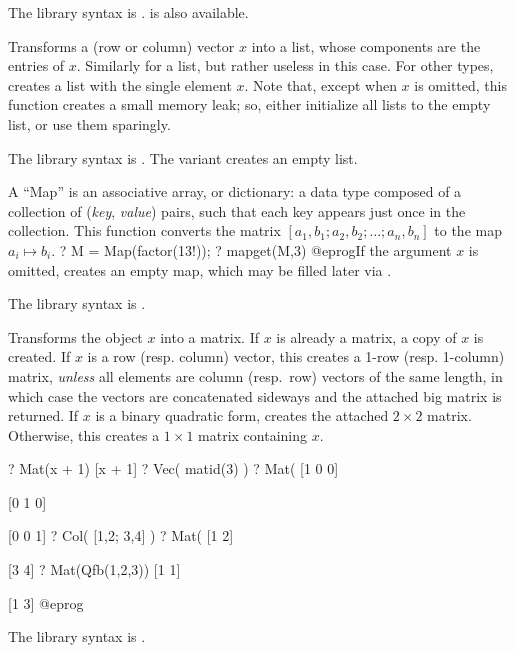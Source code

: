 The library syntax is .
 is also available.

\label{se:List}
Transforms a (row or column) vector $x$ into a list, whose components are
the entries of $x$. Similarly for a list, but rather useless in this case.
For other types, creates a list with the single element $x$. Note that,
except when $x$ is omitted, this function creates a small memory leak; so,
either initialize all lists to the empty list, or use them sparingly.

The library syntax is .
The variant  creates an empty list.

\label{se:Map}
A ``Map'' is an associative array, or dictionary: a data
type composed of a collection of (\emph{key}, \emph{value}) pairs, such that
each key appears just once in the collection. This function
converts the matrix $[a_1,b_1;a_2,b_2;\dots;a_n,b_n]$ to the map $a_i\mapsto
b_i$.
\bprog
? M = Map(factor(13!));
? mapget(M,3)
@eprog\noindent If the argument $x$ is omitted, creates an empty map, which
may be filled later via .

The library syntax is .

\label{se:Mat}
Transforms the object $x$ into a matrix.
If $x$ is already a matrix, a copy of $x$ is created.
If $x$ is a row (resp. column) vector, this creates a 1-row (resp.
1-column) matrix, \emph{unless} all elements are column (resp.~row) vectors
of the same length, in which case the vectors are concatenated sideways
and the attached big matrix is returned.
If $x$ is a binary quadratic form, creates the attached $2\times 2$
matrix. Otherwise, this creates a $1\times 1$ matrix containing $x$.

\bprog
? Mat(x + 1)
[x + 1]
? Vec( matid(3) )
? Mat(%
[1 0 0]

[0 1 0]

[0 0 1]
? Col( [1,2; 3,4] )
? Mat(%
[1 2]

[3 4]
? Mat(Qfb(1,2,3))
[1 1]

[1 3]
@eprog

The library syntax is .

